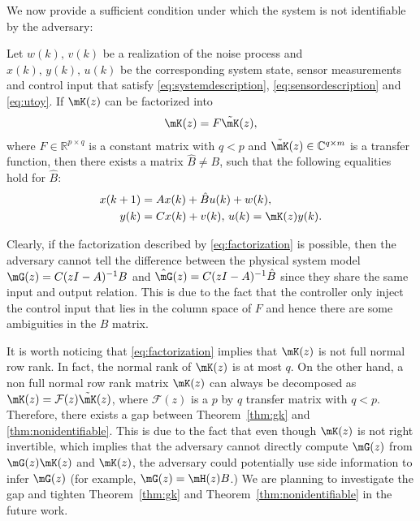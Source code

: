   We now provide a sufficient condition under which the system is not identifiable by the adversary:
  \begin{theorem}
    \label{thm:nonidentifiable}
    Let $w(k),\,v(k)$ be a realization of the noise process and $x(k),\,y(k),\,u(k)$ be the corresponding system state, sensor measurements and control input that satisfy \eqref{eq:systemdescription}, \eqref{eq:sensordescription} and \eqref{eq:utoy}. If $\mK(z)$ can be factorized into
    \begin{align}
      \mK(z) = F\tilde \mK(z), 
      \label{eq:factorization}
    \end{align}
    where $F\in \mathbb R^{p\times q}$ is a constant matrix with $q < p$ and $\tilde \mK(z)\in \mathbb C^{q\times m}$ is a transfer function, then there exists a matrix $\hat B\neq B$, such that the following equalities hold for $\hat B$:
    \begin{align*}
      x(k+1) &= Ax(k) + \hat Bu(k) + w(k),\\
      y(k) & = Cx(k) + v(k),\,u(k) = \mK(z)y(k).
    \end{align*}
  \end{theorem}

  \begin{remark}
    Clearly, if the factorization described by \eqref{eq:factorization} is possible, then the adversary cannot tell the difference between the physical system model $\mG(z) = C(zI-A)^{-1}B$ and $\hat \mG(z) = C(zI-A)^{-1}\hat B$ since they share the same input and output relation. This is due to the fact that the controller only inject the control input that lies in the column space of $F$ and hence there are some ambiguities in the $B$ matrix.

    It is worth noticing that \eqref{eq:factorization} implies that $\mK(z)$ is not full normal row rank. In fact, the normal rank of $\mK(z)$ is at most $q$. On the other hand, a non full normal row rank matrix $\mK(z)$ can always be decomposed as $\mK(z) = \mathcal F(z)\tilde \mK(z)$, where $\mathcal F(z)$ is a $p$ by $q$ transfer matrix with $q<p$. Therefore, there exists a gap between Theorem~\ref{thm:gk} and \ref{thm:nonidentifiable}. This is due to the fact that even though $\mK(z)$ is not right invertible, which implies that the adversary cannot directly compute $\mG(z)$ from $\mG(z)\mK(z)$ and $\mK(z)$, the adversary could potentially use side information to infer $\mG(z)$ (for example, $\mG(z) = \mH(z)B$.) We are planning to investigate the gap and tighten Theorem~\ref{thm:gk} and Theorem~\ref{thm:nonidentifiable} in the future work.
  \end{remark}

